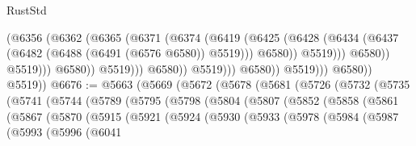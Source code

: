 \begin{lexlean}{RustStd}
\begin{coremodule}
                                            (@6356
                                              (@6362
                                                (@6365
                                                  (@6371
                                                    (@6374
                                                      (@6419
                                                        (@6425
                                                          (@6428
                                                            (@6434
                                                              (@6437
                                                                (@6482
                                                                  (@6488
                                                                    (@6491 (@6576 @6580))
                                                                    @5519)))
                                                              @6580))
                                                          @5519)))
                                                    @6580))
                                                @5519)))
                                          @6580))
                                      @5519)))
                                @6580))
                            @5519)))
                      @6580))
                  @5519)))
            @6580))
        @5519))
@6676 := @5663
    (@5669
      (@5672
        (@5678
          (@5681
            (@5726
              (@5732
                (@5735
                  (@5741
                    (@5744
                      (@5789
                        (@5795
                          (@5798
                            (@5804
                              (@5807
                                (@5852
                                  (@5858
                                    (@5861
                                      (@5867
                                        (@5870
                                          (@5915
                                            (@5921
                                              (@5924
                                                (@5930
                                                  (@5933
                                                    (@5978
                                                      (@5984
                                                        (@5987
                                                          (@5993
                                                            (@5996
                                                              (@6041

\end{coremodule}
\end{lexlean}
